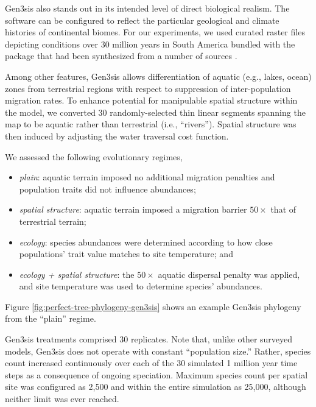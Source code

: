 Gen3sis also stands out in its intended level of direct biological realism.
The software can be configured to reflect the particular geological and climate histories of continental biomes.
For our experiments, we used curated raster files depicting conditions over 30 million years in South America bundled with the package that had been synthesized from a number of sources \citep{straume2020global,westerhold2020astronomically,fick2017worldclim,hagen2019mountain,annan2013new,cramwinckel2018synchronous,evans2018eocene,hollis2019deepmip,hutchinson2018climate,keating2011warm,sijp2014role,zhang2019evolution}.

Among other features, Gen3sis allows differentiation of aquatic (e.g., lakes, ocean) zones from terrestrial regions with respect to suppression of inter-population migration rates.
To enhance potential for manipulable spatial structure within the model, we converted 30 randomly-selected thin linear segments spanning the map to be aquatic rather than terrestrial (i.e., ``rivers'').
Spatial structure was then induced by adjusting the water traversal cost function.



We assessed the following evolutionary regimes,
\begin{itemize}
\item \textit{plain}: aquatic terrain imposed no additional migration penalties and population traits did not influence abundances;
\item \textit{spatial structure}: aquatic terrain imposed a migration barrier $50\times$ that of terrestrial terrain;
\item \textit{ecology}: species abundances were determined according to how close populations' trait value matches to site temperature; and
\item \textit{ecology + spatial structure}: the $50\times$ aquatic dispersal penalty was applied, and site temperature was used to determine species' abundances.
\end{itemize}
Figure \ref{fig:perfect-tree-phylogeny-gen3sis} shows an example Gen3sis phylogeny from the ``plain'' regime.

Gen3sis treatments comprised 30 replicates.
Note that, unlike other surveyed models, Gen3sis does not operate with constant ``population size.''
Rather, species count increased continuously over each of the 30 simulated 1 million year time steps as a consequence of ongoing speciation.
Maximum species count per spatial site was configured as 2,500 and within the entire simulation as 25,000, although neither limit was ever reached.

